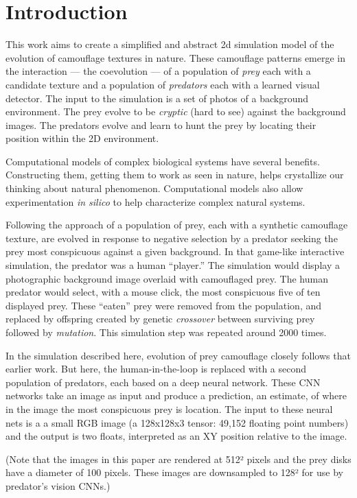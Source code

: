 \documentclass[sigconf]{acmart}
\begin{document}
\section{Introduction}
This work aims to create a simplified and abstract 2d simulation model of the evolution of camouflage textures in nature. These camouflage patterns emerge in the interaction — the coevolution — of a population of \textit{prey} each with a candidate texture and a population of \textit{predators} each with a learned visual detector. The input to the simulation is a set of photos of a background environment. The prey evolve to be \textit{cryptic} (hard to see) against the background images. The predators evolve and learn to hunt the prey by locating their position within the 2D environment.
\par
Computational models of complex biological systems have several benefits. Constructing them, getting them to work as seen in nature, helps crystallize our thinking about natural phenomenon. Computational models also allow experimentation \textit{in silico} to help characterize complex natural systems.
\par
Following the approach of \citet{Reynolds2011} a population of prey, each with a synthetic camouflage texture, are evolved in response to negative selection by a predator seeking the prey most conspicuous against a given background. In that game-like interactive simulation, the predator was a human “player.” The simulation would display a photographic background image overlaid with camouflaged prey. The human predator would select, with a mouse click, the most conspicuous five of ten displayed prey. These “eaten” prey were removed from the population, and replaced by offspring created by genetic \textit{crossover} between surviving prey followed by \textit{mutation}. This simulation step was repeated around 2000 times.
\par
In the simulation described here, evolution of prey camouflage closely follows that earlier work. But here, the human-in-the-loop is replaced with a second population of predators, each based on a deep neural network. These CNN networks take an image as input and produce a prediction, an estimate, of where in the image the most conspicuous prey is location. The input to these neural nets is a a small RGB image (a 128x128x3 tensor: 49,152 floating point numbers) and the output is two floats, interpreted as an XY position relative to the image. 
\par
(Note that the images in this paper are rendered at 512² pixels and the prey disks have a diameter of 100 pixels. These images are downsampled to 128² for use by predator's vision CNNs.)
\end{document}
